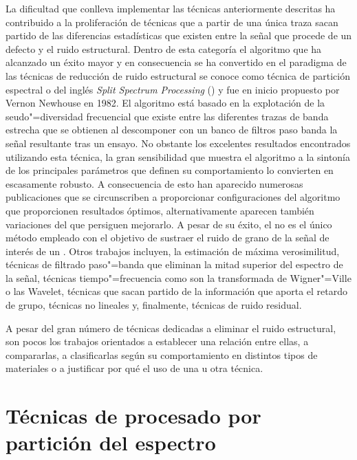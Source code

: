 La dificultad que conlleva implementar las técnicas anteriormente descritas
ha contribuido a la proliferación de técnicas que a partir de una única
traza sacan partido de las diferencias estadísticas que existen entre la
señal que procede de un defecto y el ruido estructural. Dentro de esta
categoría el algoritmo que ha alcanzado un éxito mayor y en consecuencia se
ha convertido en el paradigma de las técnicas de reducción de ruido
estructural se conoce como técnica de partición espectral o del inglés
\emph{Split Spectrum Processing} () y fue en inicio propuesto por
Vernon Newhouse en 1982. El algoritmo está basado en la explotación de la
seudo"=diversidad frecuencial que existe entre las diferentes trazas de
banda estrecha que se obtienen al descomponer con un banco de filtros paso
banda la señal resultante tras un ensayo. No obstante los excelentes
resultados encontrados utilizando esta técnica, la gran sensibilidad que
muestra el algoritmo a la sintonía de los principales parámetros que
definen su comportamiento lo convierten en escasamente robusto. A
consecuencia de esto han aparecido numerosas publicaciones que se
circunscriben a proporcionar configuraciones del algoritmo que proporcionen
resultados óptimos, alternativamente aparecen también variaciones del
 que persiguen mejorarlo. A pesar de su éxito, el  no es
el único método empleado con el objetivo de sustraer el ruido de grano de
la señal de interés de un . Otros trabajos incluyen, la
estimación de máxima verosimilitud, técnicas de filtrado paso"=banda que
eliminan la mitad superior del espectro de la señal, técnicas
tiempo"=frecuencia como son la transformada de Wigner"=Ville o las Wavelet,
técnicas que sacan partido de la información que aporta el retardo de
grupo, técnicas no lineales y, finalmente, técnicas de ruido residual.

A pesar del gran número de técnicas dedicadas a eliminar el ruido
estructural, son pocos los trabajos orientados a establecer una relación
entre ellas, a compararlas, a clasificarlas según su comportamiento en
distintos tipos de materiales o a justificar por qué el uso de una u otra
técnica.


\section{Técnicas de procesado por partición del espectro}

